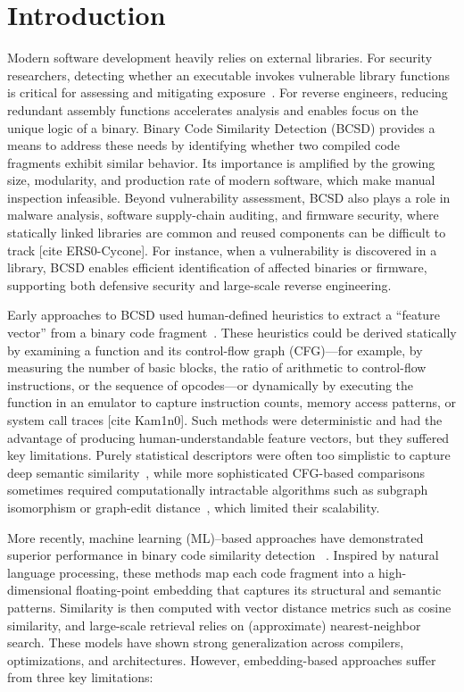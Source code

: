\section{Introduction}

Modern software development heavily relies on external libraries.
For security researchers, detecting whether an executable invokes vulnerable library functions is critical for assessing and mitigating exposure~\cite{BCSD, BCSDsurvey}. For reverse engineers, reducing redundant assembly functions accelerates analysis and enables focus on the unique logic of a binary. Binary Code Similarity Detection (BCSD) provides a means to address these needs by identifying whether two compiled code fragments exhibit similar behavior. Its importance is amplified by the growing size, modularity, and production rate of modern software, which make manual inspection infeasible. Beyond vulnerability assessment, BCSD also plays a role in malware analysis, software supply-chain auditing, and firmware security, where statically linked libraries are common and reused components can be difficult to track [cite ERS0-Cycone]. For instance, when a vulnerability is discovered in a library, BCSD enables efficient identification of affected binaries or firmware, supporting both defensive security and large-scale reverse engineering.

Early approaches to BCSD used human-defined heuristics to extract a “feature vector” from a binary code fragment~\cite{op-seq, BinDiff, clones.net}. These heuristics could be derived statically by examining a function and its control-flow graph (CFG)—for example, by measuring the number of basic blocks, the ratio of arithmetic to control-flow instructions, or the sequence of opcodes—or dynamically by executing the function in an emulator to capture instruction counts, memory access patterns, or system call traces [cite Kam1n0]. Such methods were deterministic and had the advantage of producing human-understandable feature vectors, but they suffered key limitations. Purely statistical descriptors were often too simplistic to capture deep semantic similarity~\cite{op-seq}, while more sophisticated CFG-based comparisons sometimes required computationally intractable algorithms such as subgraph isomorphism or graph-edit distance~\cite{BinDiff}, which limited their scalability.

More recently, machine learning (ML)–based approaches have demonstrated superior performance in binary code similarity detection ~\cite{SAFE,PalmTree,OrderMatters,Asm2Vec,CLAP}. Inspired by natural language processing, these methods map each code fragment into a high-dimensional floating-point embedding that captures its structural and semantic patterns. Similarity is then computed with vector distance metrics such as cosine similarity, and large-scale retrieval relies on (approximate) nearest-neighbor search. These models have shown strong generalization across compilers, optimizations, and architectures.
However, embedding-based approaches suffer from three key limitations:


